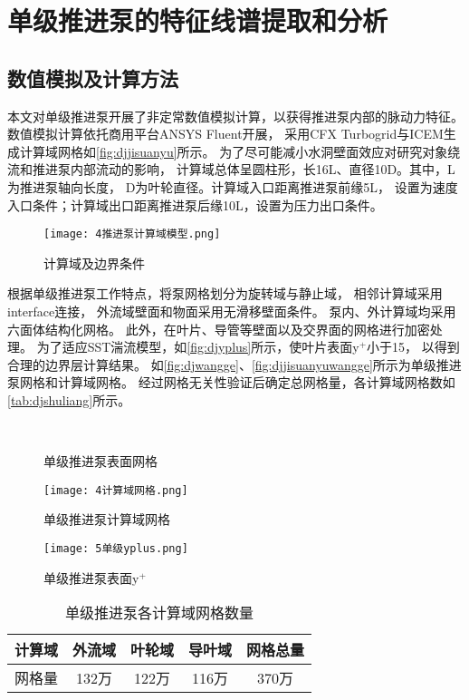 \section{单级推进泵的特征线谱提取和分析}
\subsection{数值模拟及计算方法}
本文对单级推进泵开展了非定常数值模拟计算，以获得推进泵内部的脉动力特征。
数值模拟计算依托商用平台ANSYS Fluent开展，
采用CFX Turbogrid与ICEM生成计算域网格如\autoref{fig:djjisuanyu}所示。
为了尽可能减小水洞壁面效应对研究对象绕流和推进泵内部流动的影响，
计算域总体呈圆柱形，长16L、直径10D\cite{jiang2017}。其中，L为推进泵轴向长度，
D为叶轮直径。计算域入口距离推进泵前缘5L，
设置为速度入口条件；计算域出口距离推进泵后缘10L，设置为压力出口条件。
\begin{figure}[htbp]
    \centering
    \texttt{[image: 4推进泵计算域模型.png]}
    \caption{\label{fig:djjisuanyu}计算域及边界条件}
\end{figure}

根据单级推进泵工作特点，将泵网格划分为旋转域与静止域，
相邻计算域采用interface连接，
外流域壁面和物面采用无滑移壁面条件。
泵内、外计算域均采用六面体结构化网格。
此外，在叶片、导管等壁面以及交界面的网格进行加密处理。
为了适应SST湍流模型，如\autoref{fig:djyplus}所示，使叶片表面y$^+$小于15，
以得到合理的边界层计算结果。
如\autoref{fig:djwangge}、\autoref{fig:djjisuanyuwangge}所示为单级推进泵网格和计算域网格。
经过网格无关性验证后确定总网格量，各计算域网格数如\autoref{tab:djshuliang}所示。
\begin{figure}[htbp]
    \centering
    \caption{\label{fig:djwangge}单级推进泵表面网格}
\end{figure}
\begin{figure}[htbp]
    \centering
    \texttt{[image: 4计算域网格.png]}
    \caption{\label{fig:djjisuanyuwangge}单级推进泵计算域网格}
\end{figure}
\begin{figure}[htbp]
    \centering
    \texttt{[image: 5单级yplus.png]}
    \caption{\label{fig:djyplus}单级推进泵表面y$^+$}
\end{figure}
\begin{table}[htbp]
    \centering
    \caption{\label{tab:djshuliang}单级推进泵各计算域网格数量}
    \begin{tabular}{ccccc}
        \toprule
        计算域 & 外流域 & 叶轮域 & 导叶域  & 网格总量 \\
        \midrule
        网格量 & 132万 & 122万 & 116万 & 370万 \\
        \bottomrule
    \end{tabular}
\end{table}

